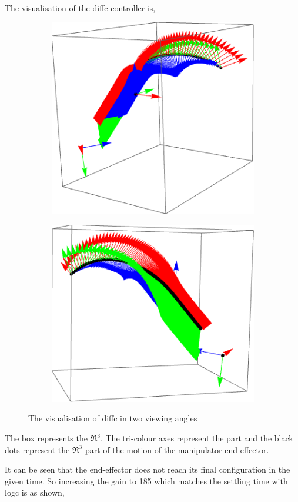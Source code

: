 \documentclass[a4paper,12pt]{article}
\begin{document}
The \SE visualisation of the diffc controller is,
\begin{figure}[H]
	\centering
	\begin{subfigure}
		\centering
		\includegraphics[scale=0.5]{diffc}
		\label{fg:diff_se}
	\end{subfigure}
	\begin{subfigure}
		\centering
		\includegraphics[scale=0.5]{diffc_2}
		\label{fg:diff_se_2}
	\end{subfigure}
	\caption{The \SE visualisation of diffc in two viewing angles}
\end{figure}
The box represents the $\Re^3$. The tri-colour axes represent the \SO part and the black dots represent the $\Re^3$ part of the motion of the manipulator end-effector.

It can be seen that the end-effector does not reach its final configuration in the given time. So increasing the gain to 185 which matches the settling time with logc is as shown, 
\end{document}
